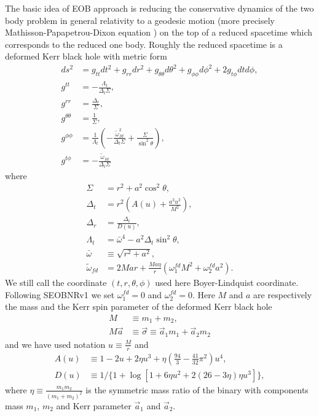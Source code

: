 \documentclass[prd,aps,a4paper,superscriptaddress,twocolumn,footinbib,showpacs]{revtex4}
\begin{document}
The basic idea of EOB approach is reducing the conservative dynamics of the two body problem in general relativity to a geodesic motion (more precisely Mathisson-Papapetrou-Dixon equation \cite{PhysRevD.80.104025}) on the top of a reduced spacetime which corresponds to the reduced one body. Roughly the reduced spacetime is a deformed Kerr black hole with metric form \cite{PhysRevD.81.084024}
\begin{align}
ds^2&=g_{tt}dt^2+g_{rr}dr^2+g_{\theta\theta}d\theta^2+g_{\phi\phi}d\phi^2+2g_{t\phi}dtd\phi,\\
g^{tt}&=-\frac{\Lambda_t}{\Delta_t\Sigma},\\
g^{rr}&=\frac{\Delta_r}{\Sigma},\\
g^{\theta\theta}&=\frac{1}{\Sigma},\\
g^{\phi\phi}&=\frac{1}{\Lambda_t}(-\frac{\tilde{\omega}_{fd}^2}{\Delta_t\Sigma}+\frac{\Sigma}{\sin^2\theta}),\\
g^{t\phi}&=-\frac{\tilde{\omega}_{fd}}{\Delta_t\Sigma}
\end{align}
where
\begin{align}
\Sigma&=r^2+a^2\cos^2\theta,\\
\Delta_t&=r^2(A(u)+\frac{a^2u^2}{M^2}),\\
\Delta_r&=\frac{\Delta_t}{D(u)},\\
\Lambda_t&=\bar{\omega}^4-a^2\Delta_t\sin^2\theta,\\
\bar{\omega}&\equiv\sqrt{r^2+a^2},\\
\tilde{\omega}_{fd}&=2Mar+\frac{Ma\eta}{r}(\omega^{fd}_1M^2+\omega^{fd}_2a^2).
\end{align}
We still call the coordinate $(t,r,\theta,\phi)$ used here Boyer-Lindquist coordinate. Following SEOBNRv1 we set $\omega^{fd}_1=0$ and $\omega^{fd}_2=0$. Here $M$ and $a$ are respectively the mass and the Kerr spin parameter of the deformed Kerr black hole
\begin{align}
M&\equiv m_1+m_2,\\
M\vec{a}&\equiv\vec{\sigma} \equiv \vec{a}_1m_1+\vec{a}_2m_2
\end{align}
and we have used notation $u\equiv\frac{M}{r}$ and
\begin{align}
A(u)&\equiv1-2u+2\eta u^3+\eta(\frac{94}{3}-\frac{41}{32}\pi^2)u^4,\\
D(u)&\equiv1/\{1+\log[1+6\eta u^2+2(26-3\eta)\eta u^3]\},
\end{align}
where $\eta\equiv\frac{m_1m_2}{(m_1+m_2)^2}$ is the symmetric mass ratio of the binary with components mass $m_1$, $m_2$ and Kerr parameter $\vec{a}_1$ and $\vec{a}_2$.
\end{document}
